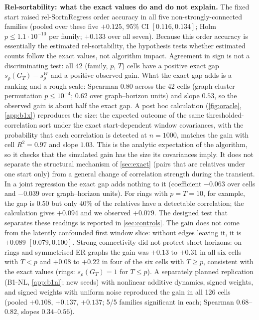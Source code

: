 \documentclass[pdflatex,sn-apa]{sn-jnl}
\theoremstyle{thmstyleone}
\theoremstyle{thmstylethree}
\theoremstyle{thmstyletwo}
\newcommand{\GT}{G_T}
\newcommand{\srho}{s_\rho}
\begin{document}
\textbf{Rel-sortability: what the exact values do and do not explain.} The
fixed start raised rel-SortnRegress order accuracy in all five
non-strongly-connected families (pooled over these five $+0.125$, 95\% CI
$[0.116,0.134]$; Holm $p\le1.1\cdot10^{-10}$ per family; $+0.133$ over all
seven). Because this order accuracy is essentially the estimated
rel-sortability, the hypothesis tests whether estimated counts follow the exact
values, not algorithm impact. Agreement in sign is not a discriminating test:
all 42 (family, $p$, $T$) cells have a positive exact gap
$\srho(\GT)-\srho^W$ and a positive observed gain. What the exact gap adds is a
ranking and a rough scale: Spearman $0.80$ across the 42 cells (graph-cluster
permutation $p\le10^{-4}$; $0.62$ over graph--horizon units) and slope $0.53$,
so the observed gain is about half the exact gap. A post hoc calculation
(\cref{fig:oracle}, \cref{app:b1x}) reproduces the size: the expected outcome
of the same thresholded-correlation sort under the exact start-dependent
window covariances, with the probability that each correlation is detected at
$n=1000$, matches the gain with cell $R^2=0.97$ and slope $1.03$. This is the
analytic expectation of the algorithm, so it checks that the simulated gain
has the size its covariances imply. It does not separate the structural
mechanism of \cref{sec:exact} (pairs that are relatives under one start only)
from a general change of correlation strength during the transient. In a
joint regression the exact gap adds nothing to it (coefficient $-0.063$ over
cells and $-0.039$ over graph--horizon units). For rings with $p=T=10$, for
example, the gap is $0.50$ but only $40\%$ of the relatives have a detectable
correlation; the calculation gives $+0.094$ and we observed $+0.079$. The designed
test that separates these readings is reported in \cref{sec:controls}. The gain
does not come from the latently confounded first window slice: without edges
leaving it, it is $+0.089$ $[0.079,0.100]$. Strong connectivity did not protect
short horizons: on rings and symmetrised ER graphs the gain was $+0.13$ to
$+0.31$ in all six cells with $T<p$ and $+0.08$ to $+0.22$ in four of the six
cells with $T\ge p$, consistent with the exact values (rings: $\srho(\GT)=1$
for $T\le p$). A separately planned replication (B1-NL, \cref{app:b1nl}; new
seeds) with nonlinear additive dynamics, signed weights, and signed weights
with uniform noise reproduced the gain in all 126 cells (pooled $+0.108$,
$+0.137$, $+0.137$; 5/5 families significant in each; Spearman $0.68$--$0.82$,
slopes $0.34$--$0.56$).
\end{document}
